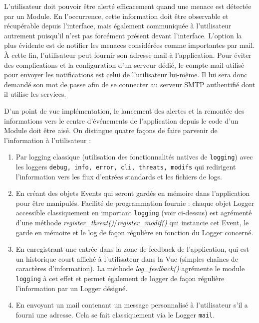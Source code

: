 \documentclass[]{article}
\begin{document}
\par L'utilisateur doit pouvoir être alerté efficacement quand une menace est détectée par un Module. En l'occurrence, cette information doit être observable et récupérable depuis l'interface, mais également communiquée à l'utilisateur autrement puisqu'il n'est pas forcément présent devant l'interface. L'option la plus évidente est de notifier les menaces considérées comme importantes par mail. À cette fin, l'utilisateur peut fournir son adresse mail à l'application. Pour éviter des complications et la configuration d'un serveur dédié, le compte mail utilisé pour envoyer les notifications est celui de l'utilisateur lui-même. Il lui sera donc demandé son mot de passe afin de se connecter au serveur SMTP authentifié dont il utilise les services.\\

\par D'un point de vue implémentation, le lancement des alertes et la remontée des informations vers le centre d’événements de l'application depuis le code d'un Module doit être aisé. On distingue quatre façons de faire parvenir de l'information à l'utilisateur :
\begin{enumerate}
\item Par logging classique (utilisation des fonctionnalités natives de \texttt{logging}) avec les loggers \texttt{debug, info, error, cli, threats, modifs} qui redirigent l'information vers les flux d'entrées standards et les fichiers de logs.
\vspace{0.1cm}
\item En créant des objets Events qui seront gardés en mémoire dans l'application pour être manipulés. Facilité de programmation fournie : chaque objet Logger accessible classiquement en important \texttt{logging} (voir ci-dessus) est agrémenté d'une méthode \textit{register\_threat()}/\textit{register\_modif()} qui instancie cet Event, le garde en mémoire et le log de façon régulière en fonction du Logger concerné.
\vspace{0.1cm}
\item En enregistrant une entrée dans la zone de feedback de l'application, qui est un historique court affiché à l'utilisateur dans la Vue (simples chaînes de caractères d'information). La méthode \textit{log\_feedback()} agrémente le module \texttt{logging} à cet effet et permet également de logger de façon régulière l'information par un Logger désigné.
\vspace{0.1cm}
\item En envoyant un mail contenant un message personnalisé à l'utilisateur s'il a fourni une adresse. Cela se fait classiquement via le Logger \texttt{mail}. 
\end{enumerate}
\vspace{0.1cm}
\end{document}
